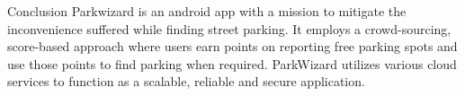 \documentclass[final]{beamer}
\newlength{\onecolwid}
\begin{document}
\begin{frame}[t]
\begin{columns}[t]
\begin{column}{\onecolwid}


\begin{alertblock}{Conclusion}
Parkwizard is an android app with a mission to mitigate the inconvenience suffered while finding street parking. It employs a crowd-sourcing, score-based approach where users earn points on reporting free parking spots and use those points to find parking when required. ParkWizard utilizes various cloud services to function as a scalable, reliable and secure application.
\end{alertblock}

\end{column} %

\end{columns} %

\end{frame} %
\end{document}
